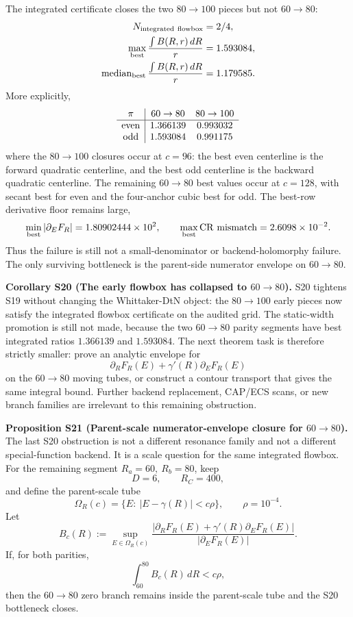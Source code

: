\documentclass[aps,prd,onecolumn,notitlepage,nofootinbib,superscriptaddress,11pt,floatfix]{revtex4-2}
\begin{document}
The integrated certificate closes the two \(80\to100\) pieces but not
\(60\to80\):
\[
\begin{aligned}
N_{\rm integrated\ flowbox}&=2/4,\\
\max_{\rm best}\frac{\int B(R,r)\,dR}{r}&=1.593084,\\
\operatorname{median}_{\rm best}\frac{\int B(R,r)\,dR}{r}&=1.179585.
\end{aligned}
\]
More explicitly,
\[
\begin{array}{c|cc}
\pi & 60\to80 & 80\to100\\
\hline
{\rm even} & 1.366139 & 0.993032\\
{\rm odd}  & 1.593084 & 0.991175
\end{array}
\]
where the \(80\to100\) closures occur at \(c=96\): the best even centerline is
the forward quadratic centerline, and the best odd centerline is the backward
quadratic centerline.  The remaining \(60\to80\) best values occur at
\(c=128\), with secant best for even and the four-anchor cubic best for odd.
The best-row derivative floor remains large,
\[
\min_{\rm best}|\partial_EF_R|=1.80902444\times10^2,
\qquad
\max_{\rm best}{\rm CR\ mismatch}=2.6098\times10^{-2}.
\]
Thus the failure is still not a small-denominator or backend-holomorphy
failure.  The only surviving bottleneck is the parent-side numerator envelope
on \(60\to80\).

\medskip\noindent\textbf{Corollary S20 (The early flowbox has collapsed to \(60\to80\)).}
S20 tightens S19 without changing the Whittaker-DtN object: the \(80\to100\)
early pieces now satisfy the integrated flowbox certificate on the audited
grid.  The static-width promotion is still not made, because the two
\(60\to80\) parity segments have best integrated ratios \(1.366139\) and
\(1.593084\).  The next theorem task is therefore strictly smaller: prove an
analytic envelope for
\[
\partial_RF_R(E)+\gamma'(R)\partial_EF_R(E)
\]
on the \(60\to80\) moving tubes, or construct a contour transport that gives
the same integral bound.  Further backend replacement, CAP/ECS scans, or new
branch families are irrelevant to this remaining obstruction.

\medskip\noindent\textbf{Proposition S21 (Parent-scale numerator-envelope closure for \(60\to80\)).}
The last S20 obstruction is not a different resonance family and not a
different special-function backend.  It is a scale question for the same
integrated flowbox.  For the remaining segment \(R_a=60,\ R_b=80\), keep
\[
D=6,\qquad R_C=400,
\]
and define the parent-scale tube
\[
\Omega_R(c)=\{E:\ |E-\gamma(R)|<c\rho\},
\qquad
\rho=10^{-4}.
\]
Let
\[
B_c(R):=
\sup_{E\in\Omega_R(c)}
\frac{|\partial_RF_R(E)+\gamma'(R)\partial_EF_R(E)|}
     {|\partial_EF_R(E)|}.
\]
If, for both parities,
\[
\int_{60}^{80} B_c(R)\,dR<c\rho,
\]
then the \(60\to80\) zero branch remains inside the parent-scale tube and the
S20 bottleneck closes.
\end{document}
